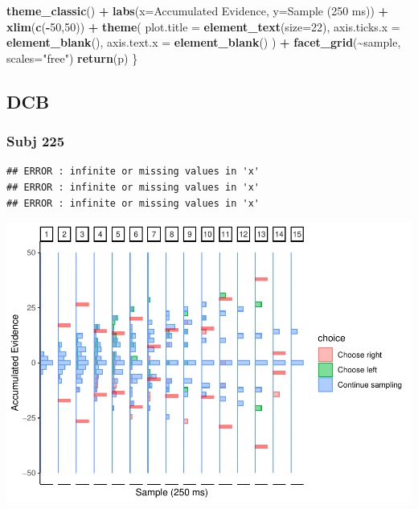 \documentclass[
]{book}
\newenvironment{Shaded}{\begin{snugshade}}{\end{snugshade}}
\newcommand{\AttributeTok}[1]{\textcolor[rgb]{0.13,0.29,0.53}{#1}}
\newcommand{\DecValTok}[1]{\textcolor[rgb]{0.00,0.00,0.81}{#1}}
\newcommand{\FunctionTok}[1]{\textcolor[rgb]{0.13,0.29,0.53}{\textbf{#1}}}
\newcommand{\NormalTok}[1]{#1}
\newcommand{\SpecialCharTok}[1]{\textcolor[rgb]{0.81,0.36,0.00}{\textbf{#1}}}
\newcommand{\StringTok}[1]{\textcolor[rgb]{0.31,0.60,0.02}{#1}}
\begin{document}
\begin{Shaded}
\begin{Highlighting}[]
    \FunctionTok{theme\_classic}\NormalTok{() }\SpecialCharTok{+}
    \FunctionTok{labs}\NormalTok{(}\AttributeTok{x=}\StringTok{\textquotesingle{}Accumulated Evidence\textquotesingle{}}\NormalTok{, }\AttributeTok{y=}\StringTok{\textquotesingle{}Sample (250 ms)\textquotesingle{}}\NormalTok{) }\SpecialCharTok{+}
    \FunctionTok{xlim}\NormalTok{(}\FunctionTok{c}\NormalTok{(}\SpecialCharTok{{-}}\DecValTok{50}\NormalTok{,}\DecValTok{50}\NormalTok{)) }\SpecialCharTok{+}
    \FunctionTok{theme}\NormalTok{(}
      \AttributeTok{plot.title =} \FunctionTok{element\_text}\NormalTok{(}\AttributeTok{size=}\DecValTok{22}\NormalTok{),}
      \AttributeTok{axis.ticks.x =} \FunctionTok{element\_blank}\NormalTok{(),}
      \AttributeTok{axis.text.x =} \FunctionTok{element\_blank}\NormalTok{()}
\NormalTok{    ) }\SpecialCharTok{+}
    \FunctionTok{facet\_grid}\NormalTok{(}\SpecialCharTok{\textasciitilde{}}\NormalTok{sample, }\AttributeTok{scales=}\StringTok{"free"}\NormalTok{)}
  \FunctionTok{return}\NormalTok{(p)}
\NormalTok{\}}
\end{Highlighting}
\end{Shaded}

\hypertarget{dcb-4}{%
\subsection{DCB}\label{dcb-4}}

\hypertarget{subj-225}{%
\subsubsection*{Subj 225}\label{subj-225}}

\begin{verbatim}
## ERROR : infinite or missing values in 'x' 
## ERROR : infinite or missing values in 'x' 
## ERROR : infinite or missing values in 'x'
\end{verbatim}

\includegraphics{LateNightBayes_files/figure-latex/unnamed-chunk-29-1.pdf}
\end{document}

